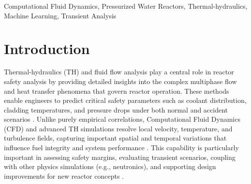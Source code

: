 \documentclass[review]{elsarticle}
\theoremstyle{definition}
\theoremstyle{definition}
\theoremstyle{remark}
\begin{document}
\begin{frontmatter}
\begin{abstract}
These physics-informed datasets were subsequently used to evaluate machine learning (ML) applications for partial field reconstruction and short-term autoregressive prediction. A 3D convolutional-based inpainting model successfully reconstructed missing assembly-level mass flow rates from partial observations, with errors concentrated in the highly turbulent base (bottom) layer and diminishing significantly in upper layers. Comparative analysis across multiple ML models demonstrates that spatially aware architectures, particularly ConvLSTM, significantly outperform sequence-based (LSTM) and operator-learning (DeepONet) approaches by effectively capturing coupled spatio-temporal dynamics. The study also highlights key challenges, including the sensitivity of inlet flow predictions to turbulence and mesh resolution, as well as the absence of full-scale experimental validation data. Despite these limitations, the results remain consistent with expected physical behavior. Overall, this work establishes high-fidelity CFD as a critical foundation for developing data-driven surrogates, sparse sensing strategies, and future multiphysics coupling frameworks, while outlining directions for scalable, interpretable, and multi-fidelity learning approaches in nuclear reactor modeling.

\end{abstract}
\begin{keyword}
Computational Fluid Dynamics, Pressurized Water Reactors, Thermal-hydraulics, Machine Learning, Transient Analysis

\end{keyword}

\end{frontmatter}



\section{Introduction}
\label{sec:intro}

Thermal-hydraulics (TH) and fluid flow analysis play a central role in reactor safety analysis by providing detailed insights into the complex multiphase flow and heat transfer phenomena that govern reactor operation. These methods enable engineers to predict critical safety parameters such as coolant distribution, cladding temperatures, and pressure drops under both normal and accident scenarios \cite{todreas2021nuclear}. Unlike purely empirical correlations, Computational Fluid Dynamics (CFD) and advanced TH simulations resolve local velocity, temperature, and turbulence fields, capturing important spatial and temporal variations that influence fuel integrity and system performance \cite{wang2021recent}. This capability is particularly important in assessing safety margins, evaluating transient scenarios, coupling with other physics simulations (e.g., neutronics), and supporting design improvements for new reactor concepts \cite{fang2024cfd,freile2021improved}.
\end{document}
